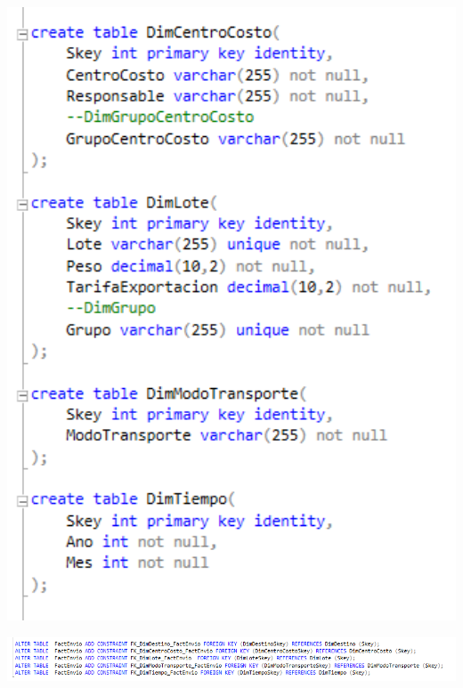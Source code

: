 	\begin{center}
	\includegraphics[width=17cm]{./Imagenes/15}
	\end{center}

	\begin{center}
	\includegraphics[width=17cm]{./Imagenes/16}
	\end{center}